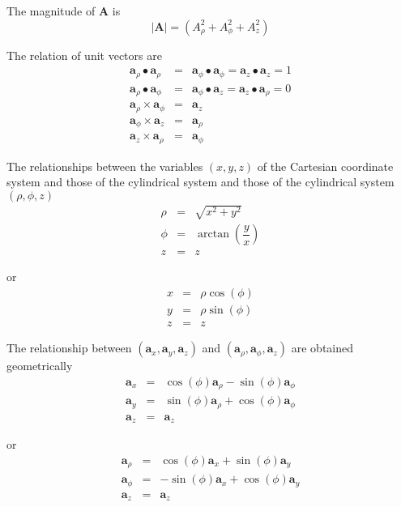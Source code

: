 \documentclass{article}
\begin{document}
The magnitude of $\mathbf{A}$ is 
\[
\left\vert \mathbf{A}\right\vert =\left( A_{\rho }^{2}+A_{\phi
}^{2}+A_{z}^{2}\right) 
\]

The relation of unit vectors are 
\begin{eqnarray*}
\mathbf{a}_{\rho }\bullet \mathbf{a}_{\rho } &=&\mathbf{a}_{\phi }\bullet 
\mathbf{a}_{\phi }=\mathbf{a}_{z}\bullet \mathbf{a}_{z}=1 \\
\mathbf{a}_{\rho }\bullet \mathbf{a}_{\phi } &=&\mathbf{a}_{\phi }\bullet 
\mathbf{a}_{z}=\mathbf{a}_{z}\bullet \mathbf{a}_{\rho }=0 \\
\mathbf{a}_{\rho }\times \mathbf{a}_{\phi } &=&\mathbf{a}_{z} \\
\mathbf{a}_{\phi }\times \mathbf{a}_{z} &=&\mathbf{a}_{\rho } \\
\mathbf{a}_{z}\times \mathbf{a}_{\rho } &=&\mathbf{a}_{\phi }
\end{eqnarray*}

The relationships between the variables $\left( x,y,z\right) $ of the
Cartesian coordinate system and those of the cylindrical system and those of
the cylindrical system $(\rho ,\phi ,z)$ 
\begin{eqnarray*}
\rho &=&\sqrt{x^{2}+y^{2}} \\
\phi &=&\arctan \left( \dfrac{y}{x}\right) \\
z &=&z
\end{eqnarray*}

or 
\begin{eqnarray*}
x &=&\rho \cos \left( \phi \right) \\
y &=&\rho \sin \left( \phi \right) \\
z &=&z
\end{eqnarray*}

The relationship between $\left( \mathbf{a}_{x},\mathbf{a}_{y},\mathbf{a}%
_{z}\right) $ and $\left( \mathbf{a}_{\rho },\mathbf{a}_{\phi },\mathbf{a}%
_{z}\right) $ are obtained geometrically 
\begin{eqnarray*}
\mathbf{a}_{x} &=&\cos \left( \phi \right) \mathbf{a}_{\rho }-\sin \left(
\phi \right) \mathbf{a}_{\phi } \\
\mathbf{a}_{y} &=&\sin \left( \phi \right) \mathbf{a}_{\rho }+\cos \left(
\phi \right) \mathbf{a}_{\phi } \\
\mathbf{a}_{z} &=&\mathbf{a}_{z}
\end{eqnarray*}

or 
\begin{eqnarray*}
\mathbf{a}_{\rho } &=&\cos \left( \phi \right) \mathbf{a}_{x}+\sin \left(
\phi \right) \mathbf{a}_{y} \\
\mathbf{a}_{\phi } &=&-\sin \left( \phi \right) \mathbf{a}_{x}+\cos \left(
\phi \right) \mathbf{a}_{y} \\
\mathbf{a}_{z} &=&\mathbf{a}_{z}
\end{eqnarray*}
\end{document}
